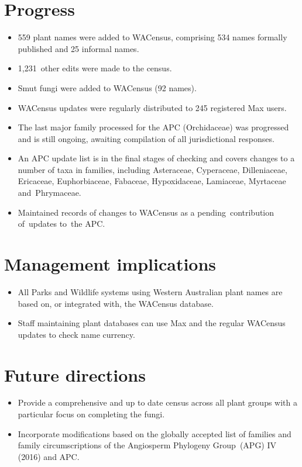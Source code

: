 \documentclass[version=last,
    paper=a4, %
    10pt, %
    usenames,
    dvipsnames,
    oneside, %
    headings=openany, %
    DIV=15 %
]{scrbook}
\begin{document}
\section*{Progress}

\begin{itemize}
\itemsep1pt\parskip0pt
\item
  559 plant names were added to WACensus, comprising 534 names formally
  published and 25 informal names.
\item
  1,231~other edits were made to the census.
\item
  Smut fungi were added to WACensus (92 names).
\item
  WACensus updates were regularly distributed to 245 registered Max
  users.
\item
  The last major family processed for the APC (Orchidaceae) was
  progressed and is still ongoing, awaiting compilation of all
  jurisdictional responses.
\item
  An APC update list is in the final stages of checking and covers
  changes to a number of taxa in families, including Asteraceae,
  Cyperaceae, Dilleniaceae, Ericaceae, Euphorbiaceae, Fabaceae,
  Hypoxidaceae, Lamiaceae, Myrtaceae and~Phrymaceae.
\item
  Maintained records of changes to WACensus as a pending~contribution
  of~updates to~the APC.
\end{itemize}




\section*{Management implications}

\begin{itemize}
\itemsep1pt\parskip0pt
\item
  All Parks and Wildlife systems using Western Australian plant names
  are based on, or integrated with, the WACensus database.
\item
  Staff maintaining plant databases can use Max and the regular WACensus
  updates to check name currency.
\end{itemize}




\section*{Future directions}

\begin{itemize}
\itemsep1pt\parskip0pt
\item
  Provide a comprehensive and up to date census across all plant groups
  with a particular focus on completing the fungi.
\item
  Incorporate modifications based on the globally accepted list of
  families and family circumscriptions of the Angiosperm Phylogeny
  Group~(APG) IV (2016) and APC.
\end{itemize}



\end{document}
